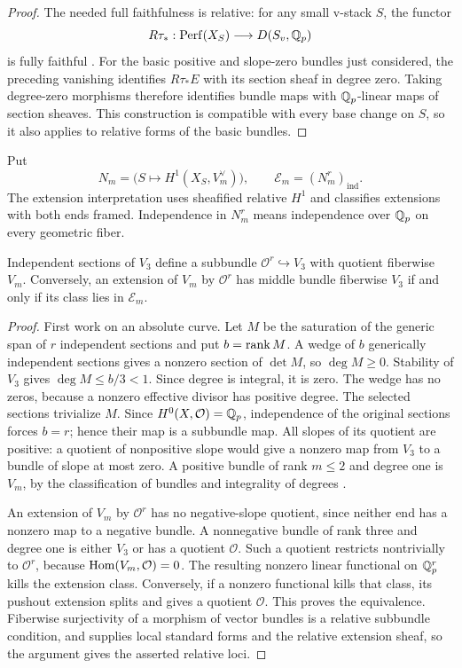\begin{proof}
The needed full faithfulness is relative: for any small v-stack
$S$, the functor
\[
 R\tau_*:\operatorname{Perf}(X_S)\longrightarrow D(S_v,\mathbb Q_p)
\]
is fully faithful \cite[Corollary 3.11]{AnschuetzLeBrasFourier}.  For the
basic positive and slope-zero bundles just considered, the
preceding vanishing identifies $R\tau_*E$ with its section
sheaf in degree zero.  Taking
degree-zero morphisms therefore identifies bundle maps with
$\mathbb Q_p$-linear maps of section sheaves.  This construction is
compatible with every base change on $S$, so it also applies to
relative forms of the basic bundles.
\end{proof}

Put
\[
 N_m=\bigl(S\longmapsto H^1(X_S,V_m^{\vee})\bigr),\qquad
 \mathcal E_m=(N_m^r)_{\mathrm{ind}}.
\]
The extension interpretation uses sheafified relative $H^1$ and
classifies extensions with both ends framed.  Independence in
$N_m^r$ means independence over $\mathbb Q_p$ on every geometric fiber.

\begin{lemma}\label{h3:geom:independent-extensions}
Independent sections of $V_3$ define a subbundle
$\mathcal O^r\hookrightarrow V_3$ with quotient fiberwise $V_m$.
Conversely, an extension of $V_m$ by $\mathcal O^r$ has middle
bundle fiberwise $V_3$ if and only if its class lies in
$\mathcal E_m$.
\end{lemma}

\begin{proof}
First work on an absolute curve.  Let $M$ be the saturation of the
generic span of $r$ independent sections and put $b=\operatorname{rank} M$.
A wedge of $b$ generically independent sections gives a nonzero
section of $\det M$, so $\deg M\geq0$.  Stability of $V_3$ gives
$\deg M\leq b/3<1$.  Since degree is integral, it is zero.
The wedge has no zeros, because a nonzero effective divisor has
positive degree.  The selected sections trivialize $M$.
Since $H^0(X,\mathcal O)=\mathbb Q_p$, independence of the original
sections forces $b=r$; hence their map is a subbundle map.
All slopes of its quotient are positive: a quotient of nonpositive
slope would give a nonzero map from $V_3$ to a bundle of slope at
most zero.  A positive bundle of rank $m\leq2$ and degree one is
$V_m$, by the classification of bundles and integrality of degrees
\cite[Theorem II.2.14]{FarguesScholze}.

An extension of $V_m$ by $\mathcal O^r$ has no negative-slope
quotient, since neither end has a nonzero map to a negative bundle.
A nonnegative bundle of rank three and degree one is either $V_3$
or has a quotient $\mathcal O$.  Such a quotient restricts
nontrivially to $\mathcal O^r$, because $\operatorname{Hom}(V_m,\mathcal O)=0$.
The resulting nonzero linear functional on $\mathbb Q_p^r$ kills the
extension class.  Conversely, if a nonzero functional kills that
class, its pushout extension splits and gives a quotient
$\mathcal O$.  This proves the equivalence.  Fiberwise
surjectivity of a morphism of vector bundles is a relative
subbundle condition, and  supplies local
standard forms and the relative extension sheaf, so the argument
gives the asserted relative loci.
\end{proof}


